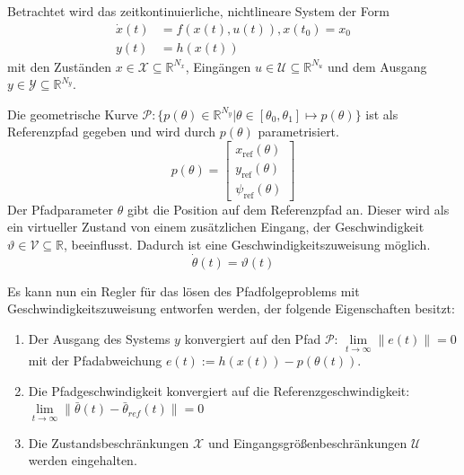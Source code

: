 \noindent Betrachtet wird das zeitkontinuierliche, nichtlineare System der Form 
\begin{align}
    \dot{x}(t)  &= f(x(t),u(t)), x(t_0)= x_0\\
    y(t)        &= h(x(t)) 
\end{align}
mit den Zuständen $x\in\mathcal{X}\subseteq\mathbb{R}^{N_x}$, Eingängen $u\in\mathcal{U}\subseteq\mathbb{R}^{N_u}$ und dem Ausgang $y\in\mathcal{Y}\subseteq\mathbb{R}^{N_y}$.
 
Die geometrische Kurve $\mathcal{P}:\{p(\theta)\in\mathbb{R}^{N_y}|\theta\in[\theta_0,\theta_1]\mapsto p(\theta)\}$ ist als Referenzpfad gegeben und wird durch $p(\theta)$ parametrisiert.
\begin{equation}
    p(\theta) = 
    \begin{bmatrix}
        x_{\text{ref}}(\theta) \\
        y_{\text{ref}}(\theta) \\
        \psi_{\text{ref}}(\theta)
    \end{bmatrix}    
\end{equation}
Der Pfadparameter $\theta$ gibt die Position auf dem Referenzpfad an. Dieser wird als ein virtueller Zustand von einem zusätzlichen Eingang, der Geschwindigkeit $\vartheta\in\mathcal{V}\subseteq\mathbb{R}$, beeinflusst. Dadurch ist eine Geschwindigkeitszuweisung möglich.
\begin{equation}
    \dot{\theta}(t)=\vartheta(t)
\end{equation}

Es kann nun ein Regler für das lösen des Pfadfolgeproblems mit Geschwindigkeitszuweisung entworfen werden, der folgende Eigenschaften besitzt:
\begin{enumerate}
    \item Der Ausgang des Systems $y$ konvergiert auf den Pfad $\mathcal{P}$: $\lim \limits_{t \to \infty} \|e(t)\| = 0$ mit der Pfadabweichung $e(t) := h(x(t)) - p(\theta(t))$.
    \item Die Pfadgeschwindigkeit konvergiert auf die Referenzgeschwindigkeit: $\lim \limits_{t \to \infty} \|\bar{\theta}(t)-\bar{\theta}_{ref}(t)\| = 0$
    \item Die Zustandsbeschränkungen $\mathcal{X}$ und Eingangsgrößenbeschränkungen $\mathcal{U}$ werden eingehalten.
\end{enumerate}

